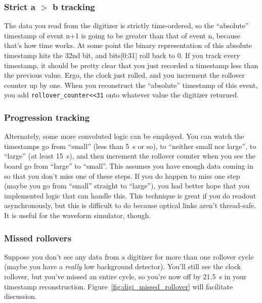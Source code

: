 \subsubsection{Strict a $>$ b tracking}

The data you read from the digitizer is strictly time-ordered, so the ``absolute'' timestamp of event n+1 is going to be greater than that of event n, because that's how time works.
At some point the binary representation of this absolute timestamp hits the 32nd bit, and bits[0:31] roll back to 0.
If you track every timestamp, it should be pretty clear that you just recorded a timestamp less than the previous value.
Ergo, the clock just rolled, and you increment the rollover counter up by one.
When you reconstruct the ``absolute'' timestamp of this event, you add \texttt{rollover\_counter<<31} onto whatever value the digitizer returned.

\subsubsection{Progression tracking}

Alternately, some more convoluted logic can be employed.
You can watch the timestamps go from ``small'' (less than \SI{5}{\second} or so), to ``neither small nor large'', to ``large'' (at least \SI{15}{\second}), and then increment the rollover counter when you see the board go from ``large'' to ``small''.
This assumes you have enough data coming in so that you don't miss one of these steps.
If you do happen to miss one step (maybe you go from ``small'' straight to ``large''), you had better hope that you implemented logic that can handle this.
This technique is great if you do readout asynchronously, but this is difficult to do because optical links aren't thread-safe.
It is useful for the waveform simulator, though.

\subsubsection{Missed rollovers}

Suppose you don't see any data from a digitizer for more than one rollover cycle (maybe you have a \emph{really} low background detector).
You'll still see the clock rollover, but you've missed an entire cycle, so you're now off by \SI{21.5}{\second} in your timestamp reconstruction.
Figure~\ref{fig:digi_missed_rollover} will facilitate discussion.

